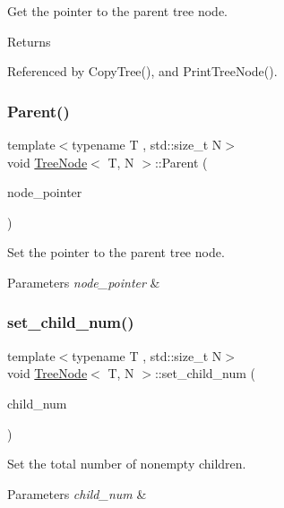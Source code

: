 Get the pointer to the parent tree node. \begin{DoxyReturn}{Returns}

\end{DoxyReturn}


Referenced by Copy\+Tree(), and Print\+Tree\+Node().

\mbox{\label{classTreeNode_a412b1980ecabb954901391b73332e657}} 
\subsubsection{\texorpdfstring{Parent()}{Parent()}\hspace{0.1cm}{\footnotesize\ttfamily [2/2]}}
{\footnotesize\ttfamily template$<$typename T , std\+::size\+\_\+t N$>$ \\
void \hyperlink{classTreeNode}{Tree\+Node}$<$ T, N $>$\+::Parent (\begin{DoxyParamCaption}\item[{const \hyperlink{classTreeNode}{Tree\+Node}$<$ T, N $>$ $\ast$}]{node\+\_\+pointer }\end{DoxyParamCaption})}

Set the pointer to the parent tree node. 
\begin{DoxyParams}{Parameters}
{\em node\+\_\+pointer} & \\
\hline
\end{DoxyParams}
\mbox{\label{classTreeNode_a68c80783a2900d01a37fc33f14951e66}} 
\subsubsection{\texorpdfstring{set\+\_\+child\+\_\+num()}{set\_child\_num()}}
{\footnotesize\ttfamily template$<$typename T , std\+::size\+\_\+t N$>$ \\
void \hyperlink{classTreeNode}{Tree\+Node}$<$ T, N $>$\+::set\+\_\+child\+\_\+num (\begin{DoxyParamCaption}\item[{const unsigned int}]{child\+\_\+num }\end{DoxyParamCaption})}

Set the total number of nonempty children. 
\begin{DoxyParams}{Parameters}
{\em child\+\_\+num} & \\
\hline
\end{DoxyParams}


